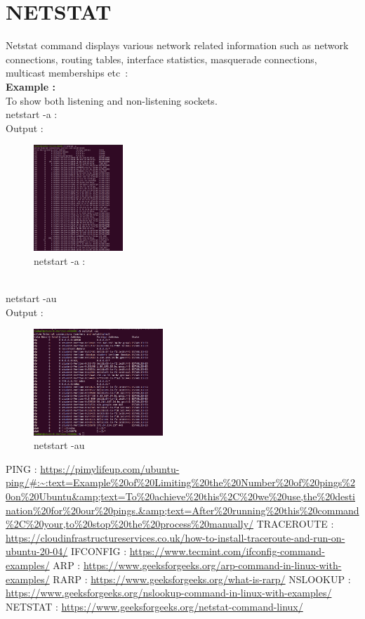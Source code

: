 \documentclass[11pt]{article}
\begin{document}
\section{NETSTAT}
Netstat command displays various network related information such as network connections, routing tables, interface statistics, masquerade connections, multicast memberships etc :\\[6pt]
\textbf{Example : \\[12pt]}
To show both listening and 
non-listening sockets.\\[12pt]
 netstart -a  :\\[12pt]   
        Output : 
  \begin{figure}[!h]
\centering
\includegraphics[width=\textwidth,height=4cm,keepaspectratio]{netstat2.png}
\caption{netstart -a :}
\end{figure}
\\[12pt]
  netstart -au\\[12pt]   
        Output : 
  \begin{figure}[!h]
\centering
\includegraphics[width=\textwidth,height=4cm,keepaspectratio]{netstat3.png}
\caption{netstart -au}
\end{figure}
\newpage
\begin{thebibliography}{1}
  PING : \url{https://pimylifeup.com/ubuntu-ping/#:~:text=Example%20of%20Limiting%20the%20Number%20of%20pings%20on%20Ubuntu&amp;text=To%20achieve%20this%2C%20we%20use,the%20destination%20for%20our%20pings.&amp;text=After%20running%20this%20command%2C%20your,to%20stop%20the%20process%20manually/}
 TRACEROUTE : \url{https://cloudinfrastructureservices.co.uk/how-to-install-traceroute-and-run-on-ubuntu-20-04/}
 IFCONFIG : \url{https://www.tecmint.com/ifconfig-command-examples/}
 ARP : \url{https://www.geeksforgeeks.org/arp-command-in-linux-with-examples/}
 RARP : \url{https://www.geeksforgeeks.org/what-is-rarp/}
 NSLOOKUP : \url{https://www.geeksforgeeks.org/nslookup-command-in-linux-with-examples/}
 NETSTAT : \url{https://www.geeksforgeeks.org/netstat-command-linux/}
\end{thebibliography}
\end{document}
